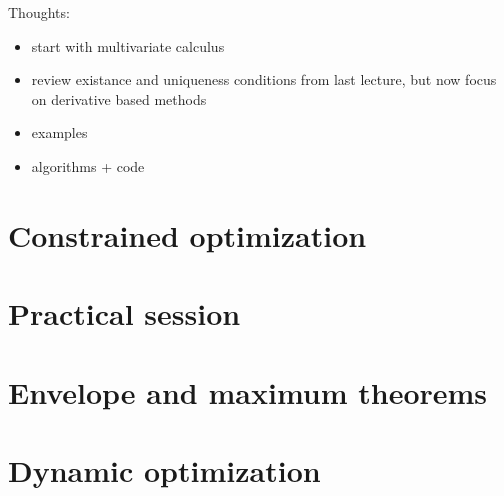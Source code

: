 \documentclass[letterpaper,10pt,english]{jupyterBook}
\begin{document}
\sphinxAtStartPar
Thoughts:
\begin{itemize}
\item {} 
\sphinxAtStartPar
start with multivariate calculus

\item {} 
\sphinxAtStartPar
review existance and uniqueness conditions from last lecture, but now focus on derivative based methods

\item {} 
\sphinxAtStartPar
examples

\item {} 
\sphinxAtStartPar
algorithms + code

\end{itemize}

\sphinxstepscope


\chapter{Constrained optimization}
\label{\detokenize{08.constrained:constrained-optimization}}\label{\detokenize{08.constrained::doc}}

\sphinxstepscope


\chapter{Practical session}
\label{\detokenize{09.practical_session:practical-session}}\label{\detokenize{09.practical_session::doc}}

\sphinxstepscope


\chapter{Envelope and maximum theorems}
\label{\detokenize{10.envelope_maximum:envelope-and-maximum-theorems}}\label{\detokenize{10.envelope_maximum::doc}}

\sphinxstepscope


\chapter{Dynamic optimization}
\label{\detokenize{11.dynamic:dynamic-optimization}}\label{\detokenize{11.dynamic::doc}}
\end{document}
